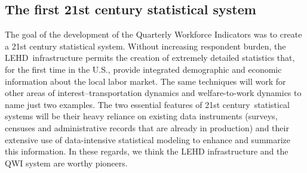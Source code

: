\subsection{The first 21st century statistical system}

The goal of the development of the Quarterly Workforce Indicators was to
create a 21st century statistical system. Without increasing respondent
burden, the LEHD\ infrastructure permits the creation of extremely detailed
statistics that, for the first time in the U.S., provide integrated
demographic and economic information about the local labor market. The same
techniques will work for other areas of interest--transportation dynamics
and welfare-to-work dynamics to name just two examples. The two essential
features of 21st century\ statistical systems will be their heavy reliance
on existing data instruments (surveys, censuses and administrative records
that are already in production) and their extensive use of data-intensive
statistical modeling to enhance and summarize this information. In these
regards, we think the LEHD infrastructure and the QWI system are worthy
pioneers.


